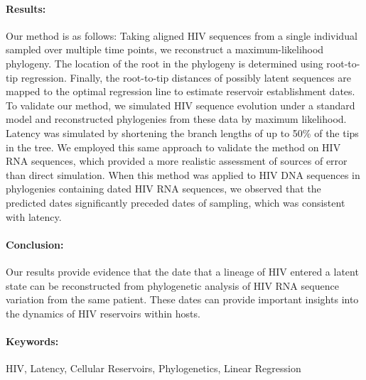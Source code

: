 \documentclass[12pt]{article}
\begin{document}
\paragraph{Results:}
Our method is as follows: Taking aligned HIV sequences from a single individual sampled over multiple time points, we reconstruct a maximum-likelihood phylogeny.
The location of the root in the phylogeny is determined using root-to-tip regression.
Finally, the root-to-tip distances of possibly latent sequences are mapped to the optimal regression line to estimate reservoir establishment dates.
To validate our method, we simulated HIV sequence evolution under a standard model and reconstructed phylogenies from these data by maximum likelihood.
Latency was simulated by shortening the branch lengths of up to 50\% of the tips in the tree.
We employed this same approach to validate the method on HIV RNA sequences, which provided a more realistic assessment of sources of error than direct simulation.
When this method was applied to HIV DNA sequences in phylogenies containing dated HIV RNA sequences, we observed that the predicted dates significantly preceded dates of sampling, which was consistent with latency.

\paragraph{Conclusion:}
Our results provide evidence that the date that a lineage of HIV entered a latent state can be reconstructed from phylogenetic analysis of HIV RNA sequence variation from the same patient.
These dates can provide important insights into the dynamics of HIV reservoirs within hosts.


\paragraph{Keywords:} 
HIV, Latency, Cellular Reservoirs, Phylogenetics, Linear Regression
\end{document}
